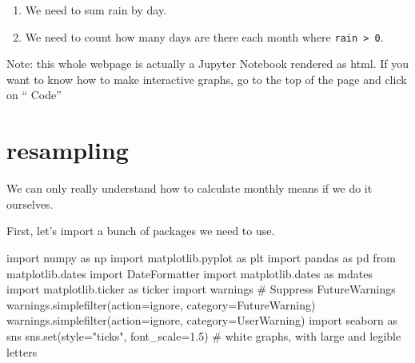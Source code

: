 \documentclass[
  letterpaper,
  DIV=11,
  numbers=noendperiod,
  oneside]{scrreprt}
\newenvironment{Shaded}{\begin{snugshade}}{\end{snugshade}}
\newcommand{\BuiltInTok}[1]{\textcolor[rgb]{0.00,0.23,0.31}{#1}}
\newcommand{\CommentTok}[1]{\textcolor[rgb]{0.37,0.37,0.37}{#1}}
\newcommand{\FloatTok}[1]{\textcolor[rgb]{0.68,0.00,0.00}{#1}}
\newcommand{\ImportTok}[1]{\textcolor[rgb]{0.00,0.46,0.62}{#1}}
\newcommand{\NormalTok}[1]{\textcolor[rgb]{0.00,0.23,0.31}{#1}}
\newcommand{\OperatorTok}[1]{\textcolor[rgb]{0.37,0.37,0.37}{#1}}
\newcommand{\PreprocessorTok}[1]{\textcolor[rgb]{0.68,0.00,0.00}{#1}}
\newcommand{\StringTok}[1]{\textcolor[rgb]{0.13,0.47,0.30}{#1}}
\providecommand{\tightlist}{%
  \setlength{\itemsep}{0pt}\setlength{\parskip}{0pt}}\usepackage{longtable,booktabs,array}
\begin{document}
\begin{tcolorbox}[enhanced jigsaw, colbacktitle=quarto-callout-note-color!10!white, opacitybacktitle=0.6, bottomrule=.15mm, leftrule=.75mm, toprule=.15mm, opacityback=0, breakable, bottomtitle=1mm, colback=white, coltitle=black, left=2mm, title={How many rainy days were there each month?}, toptitle=1mm, arc=.35mm, rightrule=.15mm, titlerule=0mm, colframe=quarto-callout-note-color-frame]

\begin{enumerate}
\def\labelenumi{\arabic{enumi}.}
\tightlist
\item
  We need to sum rain by day.
\item
  We need to count how many days are there each month where
  \texttt{rain\ \textgreater{}\ 0}.
\end{enumerate}

\end{tcolorbox}

Note: this whole webpage is actually a Jupyter Notebook rendered as
html. If you want to know how to make interactive graphs, go to the top
of the page and click on `` Code''

\hypertarget{resampling-1}{%
\chapter{resampling}\label{resampling-1}}

We can only really understand how to calculate monthly means if we do it
ourselves.

First, let's import a bunch of packages we need to use.

\begin{Shaded}
\begin{Highlighting}[]
\ImportTok{import}\NormalTok{ numpy }\ImportTok{as}\NormalTok{ np}
\ImportTok{import}\NormalTok{ matplotlib.pyplot }\ImportTok{as}\NormalTok{ plt}
\ImportTok{import}\NormalTok{ pandas }\ImportTok{as}\NormalTok{ pd}
\ImportTok{from}\NormalTok{ matplotlib.dates }\ImportTok{import}\NormalTok{ DateFormatter}
\ImportTok{import}\NormalTok{ matplotlib.dates }\ImportTok{as}\NormalTok{ mdates}
\ImportTok{import}\NormalTok{ matplotlib.ticker }\ImportTok{as}\NormalTok{ ticker}
\ImportTok{import}\NormalTok{ warnings}
\CommentTok{\# Suppress FutureWarnings}
\NormalTok{warnings.simplefilter(action}\OperatorTok{=}\StringTok{\textquotesingle{}ignore\textquotesingle{}}\NormalTok{, category}\OperatorTok{=}\PreprocessorTok{FutureWarning}\NormalTok{)}
\NormalTok{warnings.simplefilter(action}\OperatorTok{=}\StringTok{\textquotesingle{}ignore\textquotesingle{}}\NormalTok{, category}\OperatorTok{=}\PreprocessorTok{UserWarning}\NormalTok{)}
\ImportTok{import}\NormalTok{ seaborn }\ImportTok{as}\NormalTok{ sns}
\NormalTok{sns.}\BuiltInTok{set}\NormalTok{(style}\OperatorTok{=}\StringTok{"ticks"}\NormalTok{, font\_scale}\OperatorTok{=}\FloatTok{1.5}\NormalTok{)  }\CommentTok{\# white graphs, with large and legible letters}
\end{Highlighting}
\end{Shaded}
\end{document}
